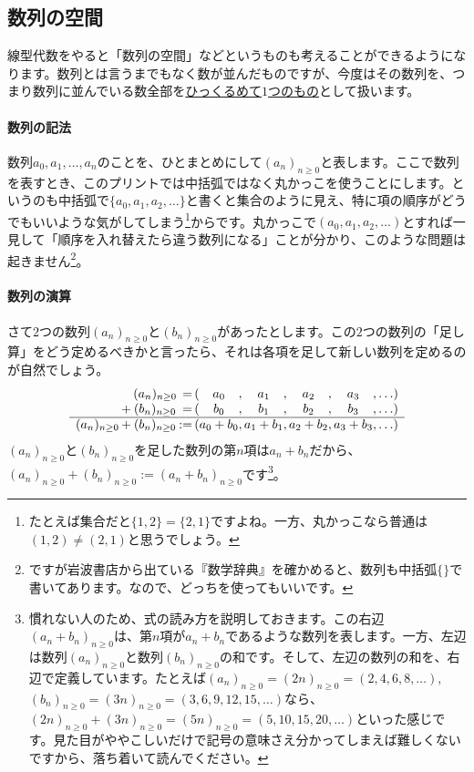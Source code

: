 \subsection{数列の空間}

線型代数をやると「数列の空間」などというものも考えることができるようになります。数列とは言うまでもなく数が並んだものですが、今度はその数列を、つまり数列に並んでいる数全部を\uline{ひっくるめて$1$つのもの}として扱います。

\paragraph{数列の記法}

数列$a_0, a_1, \ldots, a_n$のことを、ひとまとめにして$(a_n)_{n\geq 0}$と表します。ここで数列を表すとき、このプリントでは中括弧ではなく丸かっこを使うことにします。というのも中括弧で$\{a_0, a_1, a_2, \ldots\}$と書くと集合のように見え、特に項の順序がどうでもいいような気がしてしまう\footnote{たとえば集合だと$\{1, 2\} = \{2, 1\}$ですよね。一方、丸かっこなら普通は$(1, 2) \neq (2,1)$と思うでしょう。}からです。丸かっこで$(a_0, a_1, a_2, \ldots)$とすれば一見して「順序を入れ替えたら違う数列になる」ことが分かり、このような問題は起きません\footnote{ですが岩波書店から出ている『数学辞典』を確かめると、数列も中括弧$\{\}$で書いてあります。なので、どっちを使ってもいいです。}。

\paragraph{数列の演算} さて$2$つの数列$(a_n)_{n \geq 0}$と$(b_n)_{n \geq 0}$があったとします。この$2$つの数列の「足し算」をどう定めるべきかと言ったら、それは各項を足して新しい数列を定めるのが自然でしょう。
\begin{align*}
\begin{array}{c@{\,}c@{\,}c@{\,}r@{\,}c@{}c@{}c@{\,}c@{}c@{\,}c@{}c@{\,}c@{}c@{\,}l}
					&	& (a_n)_{n \geq 0} & =	& ( & a_0		& , & a_1		& , & a_2		& , & a_3		& , & \ldots) \\
					& +	& (b_n)_{n \geq 0} & =	& ( & b_0		& , & b_1		& , & b_2		& , & b_3		& , & \ldots) \\ \hline
(a_n)_{n \geq 0}	& +	& (b_n)_{n \geq 0} & :=	& ( & a_0 + b_0	& , & a_1 + b_1	& , & a_2 + b_2	& , & a_3 + b_3	& , & \ldots)
\end{array}
\end{align*}
$(a_n)_{n \geq 0}$と$(b_n)_{n \geq 0}$を足した数列の第$n$項は$a_n + b_n$だから、$(a_n)_{n \geq 0} + (b_n)_{n \geq 0} := (a_n + b_n)_{n \geq 0}$です\footnote{慣れない人のため、式の読み方を説明しておきます。この右辺$(a_n + b_n)_{n \geq 0}$は、第$n$項が$a_n + b_n$であるような数列を表します。一方、左辺は数列$(a_n)_{n \geq 0}$と数列$(b_n)_{n \geq 0}$の和です。そして、左辺の数列の和を、右辺で定義しています。たとえば$(a_n)_{n \geq 0} = (2n)_{n \geq 0} = (2, 4, 6, 8, \ldots)$, $(b_n)_{n \geq 0} = (3n)_{n \geq 0} = (3, 6, 9, 12, 15, \ldots)$なら、$(2n)_{n \geq 0} + (3n)_{n \geq 0} = (5n)_{n \geq 0} = (5, 10, 15, 20, \ldots)$といった感じです。見た目がややこしいだけで記号の意味さえ分かってしまえば難しくないですから、落ち着いて読んでください。}。

